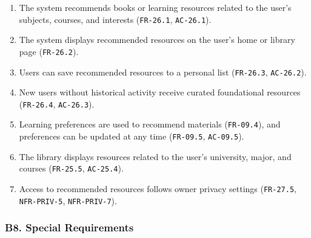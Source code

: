 \documentclass[12pt]{article}
\begin{document}
\begin{enumerate}
\item The system recommends books or learning resources related to the user's subjects, courses, and interests (\texttt{FR-26.1}, \texttt{AC-26.1}).
\item The system displays recommended resources on the user's home or library page (\texttt{FR-26.2}).
\item Users can save recommended resources to a personal list (\texttt{FR-26.3}, \texttt{AC-26.2}).
\item New users without historical activity receive curated foundational resources (\texttt{FR-26.4}, \texttt{AC-26.3}).
\item Learning preferences are used to recommend materials (\texttt{FR-09.4}), and preferences can be updated at any time (\texttt{FR-09.5}, \texttt{AC-09.5}).
\item The library displays resources related to the user's university, major, and courses (\texttt{FR-25.5}, \texttt{AC-25.4}).
\item Access to recommended resources follows owner privacy settings (\texttt{FR-27.5}, \texttt{NFR-PRIV-5}, \texttt{NFR-PRIV-7}).
\end{enumerate}
\par\medskip

\hypertarget{sec:b8-special-requirements}{}
\subsubsection*{B8. Special Requirements}
\par\medskip
\end{document}
